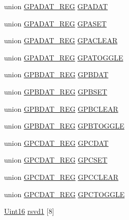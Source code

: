 \begin{DoxyCompactItemize}
\item 
union \hyperlink{union_g_p_a_d_a_t___r_e_g}{G\+P\+A\+D\+A\+T\+\_\+\+R\+E\+G} \hyperlink{struct_g_p_i_o___d_a_t_a___r_e_g_s_a85f4f90fde565247c25e38e8ca66ac8a}{G\+P\+A\+D\+A\+T}
\item 
union \hyperlink{union_g_p_a_d_a_t___r_e_g}{G\+P\+A\+D\+A\+T\+\_\+\+R\+E\+G} \hyperlink{struct_g_p_i_o___d_a_t_a___r_e_g_s_a8828ae9beffd4ff2c86f5edbe7bf8eae}{G\+P\+A\+S\+E\+T}
\item 
union \hyperlink{union_g_p_a_d_a_t___r_e_g}{G\+P\+A\+D\+A\+T\+\_\+\+R\+E\+G} \hyperlink{struct_g_p_i_o___d_a_t_a___r_e_g_s_a66b4427575a86b91795dabdc6a361e69}{G\+P\+A\+C\+L\+E\+A\+R}
\item 
union \hyperlink{union_g_p_a_d_a_t___r_e_g}{G\+P\+A\+D\+A\+T\+\_\+\+R\+E\+G} \hyperlink{struct_g_p_i_o___d_a_t_a___r_e_g_s_a40a58d8dab5ec4ff9c79ef1db970e65e}{G\+P\+A\+T\+O\+G\+G\+L\+E}
\item 
union \hyperlink{union_g_p_b_d_a_t___r_e_g}{G\+P\+B\+D\+A\+T\+\_\+\+R\+E\+G} \hyperlink{struct_g_p_i_o___d_a_t_a___r_e_g_s_ac6805f9c6b35efee1905310bbe42dd2e}{G\+P\+B\+D\+A\+T}
\item 
union \hyperlink{union_g_p_b_d_a_t___r_e_g}{G\+P\+B\+D\+A\+T\+\_\+\+R\+E\+G} \hyperlink{struct_g_p_i_o___d_a_t_a___r_e_g_s_adbfd6f9f7c582027c1b3fe5aa9096aab}{G\+P\+B\+S\+E\+T}
\item 
union \hyperlink{union_g_p_b_d_a_t___r_e_g}{G\+P\+B\+D\+A\+T\+\_\+\+R\+E\+G} \hyperlink{struct_g_p_i_o___d_a_t_a___r_e_g_s_a5655e29e2cae26360246e87942d97e28}{G\+P\+B\+C\+L\+E\+A\+R}
\item 
union \hyperlink{union_g_p_b_d_a_t___r_e_g}{G\+P\+B\+D\+A\+T\+\_\+\+R\+E\+G} \hyperlink{struct_g_p_i_o___d_a_t_a___r_e_g_s_a3ab36ec281be3524adf068a5edb85f5c}{G\+P\+B\+T\+O\+G\+G\+L\+E}
\item 
union \hyperlink{union_g_p_c_d_a_t___r_e_g}{G\+P\+C\+D\+A\+T\+\_\+\+R\+E\+G} \hyperlink{struct_g_p_i_o___d_a_t_a___r_e_g_s_a50caa3d7f222a590894e2afde5cdcce4}{G\+P\+C\+D\+A\+T}
\item 
union \hyperlink{union_g_p_c_d_a_t___r_e_g}{G\+P\+C\+D\+A\+T\+\_\+\+R\+E\+G} \hyperlink{struct_g_p_i_o___d_a_t_a___r_e_g_s_a60466ce1a65a6d8f8bfc3635f3bb18a3}{G\+P\+C\+S\+E\+T}
\item 
union \hyperlink{union_g_p_c_d_a_t___r_e_g}{G\+P\+C\+D\+A\+T\+\_\+\+R\+E\+G} \hyperlink{struct_g_p_i_o___d_a_t_a___r_e_g_s_a26cad77083b5d535db793dce9166d2ec}{G\+P\+C\+C\+L\+E\+A\+R}
\item 
union \hyperlink{union_g_p_c_d_a_t___r_e_g}{G\+P\+C\+D\+A\+T\+\_\+\+R\+E\+G} \hyperlink{struct_g_p_i_o___d_a_t_a___r_e_g_s_ab75bb29f5c79d2cfa1a7158da99bbfec}{G\+P\+C\+T\+O\+G\+G\+L\+E}
\item 
\hyperlink{_d_s_p2833x___device_8h_a59a9f6be4562c327cbfb4f7e8e18f08b}{Uint16} \hyperlink{struct_g_p_i_o___d_a_t_a___r_e_g_s_ae33ce91255743df8b4221c0c70d64792}{rsvd1} \mbox{[}8\mbox{]}
\end{DoxyCompactItemize}


